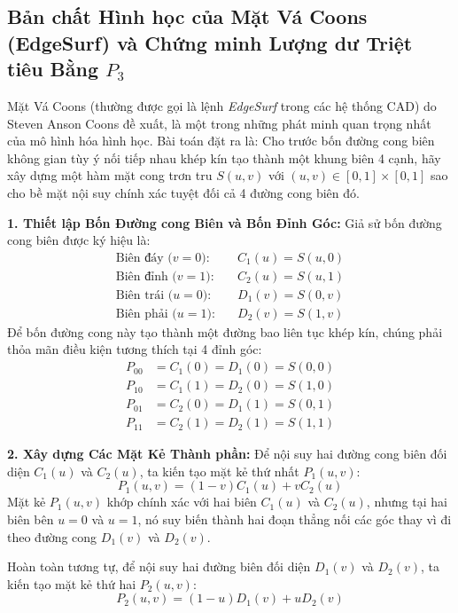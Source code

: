 \subsection{Bản chất Hình học của Mặt Vá Coons (EdgeSurf) và Chứng minh Lượng dư Triệt tiêu Bằng \texorpdfstring{$P_3$}{P3}}
\label{subsec:coons_patch_edgesurf_p3}

Mặt Vá Coons (thường được gọi là lệnh \textit{EdgeSurf} trong các hệ thống CAD) do Steven Anson Coons đề xuất, là một trong những phát minh quan trọng nhất của mô hình hóa hình học. Bài toán đặt ra là: Cho trước bốn đường cong biên không gian tùy ý nối tiếp nhau khép kín tạo thành một khung biên 4 cạnh, hãy xây dựng một hàm mặt cong trơn tru $S(u, v)$ với $(u, v) \in [0, 1] \times [0, 1]$ sao cho bề mặt nội suy chính xác tuyệt đối cả 4 đường cong biên đó.

\textbf{1. Thiết lập Bốn Đường cong Biên và Bốn Đỉnh Góc:}
Giả sử bốn đường cong biên được ký hiệu là:
\begin{align}
\text{Biên đáy ($v = 0$):} & \quad C_1(u) = S(u, 0) \\
\text{Biên đỉnh ($v = 1$):} & \quad C_2(u) = S(u, 1) \\
\text{Biên trái ($u = 0$):} & \quad D_1(v) = S(0, v) \\
\text{Biên phải ($u = 1$):} & \quad D_2(v) = S(1, v)
\end{align}
Để bốn đường cong này tạo thành một đường bao liên tục khép kín, chúng phải thỏa mãn điều kiện tương thích tại 4 đỉnh góc:
\begin{align}
P_{00} &= C_1(0) = D_1(0) = S(0, 0) \\
P_{10} &= C_1(1) = D_2(0) = S(1, 0) \\
P_{01} &= C_2(0) = D_1(1) = S(0, 1) \\
P_{11} &= C_2(1) = D_2(1) = S(1, 1)
\end{align}

\textbf{2. Xây dựng Các Mặt Kẻ Thành phần:}
Để nội suy hai đường cong biên đối diện $C_1(u)$ và $C_2(u)$, ta kiến tạo mặt kẻ thứ nhất $P_1(u, v)$:
\begin{equation}
\label{eq:coons_p1}
P_1(u, v) = (1 - v) C_1(u) + v C_2(u)
\end{equation}
Mặt kẻ $P_1(u, v)$ khớp chính xác với hai biên $C_1(u)$ và $C_2(u)$, nhưng tại hai biên bên $u=0$ và $u=1$, nó suy biến thành hai đoạn thẳng nối các góc thay vì đi theo đường cong $D_1(v)$ và $D_2(v)$.

Hoàn toàn tương tự, để nội suy hai đường biên đối diện $D_1(v)$ và $D_2(v)$, ta kiến tạo mặt kẻ thứ hai $P_2(u, v)$:
\begin{equation}
\label{eq:coons_p2}
P_2(u, v) = (1 - u) D_1(v) + u D_2(v)
\end{equation}

